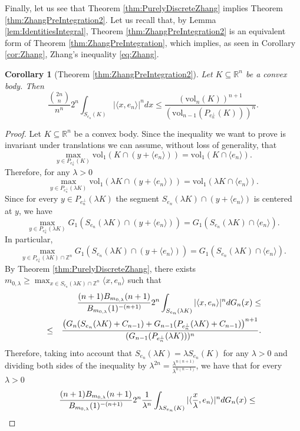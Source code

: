 \documentclass[10pt]{amsart}
\newtheorem{cor}[thm]{Corollary}
\def\R{\mathbb{R}}
\def\Z{\mathbb{Z}}
\def\vol{\mathrm{vol}}
\numberwithin{equation}{section}
\begin{document}
Finally, let us see that Theorem \ref{thm:PurelyDiscreteZhang} implies Theorem \ref{thm:ZhangPreIntegration2}. Let us recall that, by Lemma \ref{lem:IdentitiesIntegral}, Theorem \ref{thm:ZhangPreIntegration2} is an equivalent form of Theorem \ref{thm:ZhangPreIntegration}, which implies, as seen in Corollary \ref{cor:Zhang}, Zhang's inequality \eqref{eq:Zhang}.

\begin{cor}[Theorem \ref{thm:ZhangPreIntegration2}]\label{prop:FromPurelyDiscreteZhangDiscreteZhangToZhang}
Let $K\subseteq\R^n$ be a convex body. Then
$$
\frac{{{2n}\choose{n}}}{n^n}2^n\int_{S_{e_n}(K)}|\langle x,e_n\rangle|^ndx\leq\frac{(\vol_n(K))^{n+1}}{(\vol_{n-1}(P_{e_n^\perp}(K)))^n}.
$$
\end{cor}

\begin{proof}
Let $K\subseteq\R^n$ be a convex body. Since the inequality we want to prove is invariant under translations we can assume, without loss of generality, that
$$
\max_{y\in P_{e_n^\perp}(K)}\vol_1(K\cap(y+\langle e_n\rangle))=\vol_1(K\cap\langle e_n\rangle).
$$
Therefore, for any $\lambda>0$
$$
\max_{y\in P_{e_n^\perp}(\lambda K)}\vol_1(\lambda K\cap(y+\langle e_n\rangle))=\vol_1(\lambda K\cap\langle e_n\rangle).
$$
Since for every $y\in P_{e_n^\perp}(\lambda K)$ the segment $S_{e_n}(\lambda K)\cap(y+\langle e_n\rangle)$ is centered at $y$, we have
$$
\max_{y\in P_{e_n^\perp}(\lambda K)}G_1(S_{e_n}(\lambda K)\cap(y+\langle e_n\rangle))=G_1(S_{e_n}(\lambda K)\cap\langle e_n\rangle).
$$
In particular,
$$
\max_{y\in P_{e_n^\perp}(\lambda K)\cap\Z^n}G_1(S_{e_n}(\lambda K)\cap(y+\langle e_n\rangle))=G_1(S_{e_n}(\lambda K)\cap\langle e_n\rangle).
$$
By Theorem \ref{thm:PurelyDiscreteZhang}, there exists $\displaystyle{m_{0,\lambda}\geq \max_{x\in S_{e_n}(\lambda K)\cap\Z^n}\langle x,e_n\rangle}$ such that
\begin{eqnarray*}
&&\frac{(n+1)B_{m_{0,\lambda}}(n+1)}{B_{m_{0,\lambda}}(1)^{-(n+1)}}2^n\int_{S_{e_n}(\lambda K)}|\langle x,e_n\rangle|^ndG_n(x)\leq\cr
&\leq&\frac{\left(G_n(S_{e_n}(\lambda K)+C_{n-1})+G_{n-1}(P_{e_n^\perp}(\lambda K)+C_{n-1})\right)^{n+1}}{(G_{n-1}(P_{e_n^\perp}(\lambda K)))^n}.
\end{eqnarray*}
Therefore, taking into account that $S_{e_n}(\lambda K)=\lambda S_{e_n}(K)$ for any $\lambda>0$ and dividing both sides of the inequality by $\lambda^{2n}=\frac{\lambda^{n(n+1)}}{\lambda^{n(n-1)}}$, we have that for every $\lambda>0$
\begin{eqnarray*}
&&\frac{(n+1)B_{m_{0,\lambda}}(n+1)}{B_{m_{0,\lambda}}(1)^{-(n+1)}}2^n\frac{1}{\lambda^n}\int_{\lambda S_{e_n}(K)}|\langle \frac{x}{\lambda},e_n\rangle|^ndG_n(x)\leq\cr

\end{eqnarray*}
\end{proof}
\end{document}
